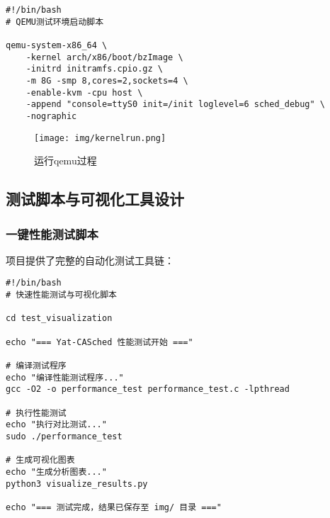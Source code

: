 \begin{tcolorbox} [
    enhanced,
    colback=green!5,
    colframe=green!40!black,
    leftrule=3mm,
    rightrule=0mm,
    toprule=0mm,
    bottomrule=0mm,
    arc=2mm,
    left=5mm,
    right=5mm,
    top=3mm,
    bottom=3mm,
    fonttitle=\bfseries,
    title=\textbf{QEMU启动脚本}
]
\begin{lstlisting}[basicstyle=\footnotesize\fontfamily{zi4}\selectfont, showstringspaces=false]
#!/bin/bash
# QEMU测试环境启动脚本

qemu-system-x86_64 \
    -kernel arch/x86/boot/bzImage \
    -initrd initramfs.cpio.gz \
    -m 8G -smp 8,cores=2,sockets=4 \
    -enable-kvm -cpu host \
    -append "console=ttyS0 init=/init loglevel=6 sched_debug" \
    -nographic
\end{lstlisting}
\end{tcolorbox}
\begin{figure}[H]
\centering

\texttt{[image: img/kernelrun.png]}

\caption{运行qemu过程}
\label{fig:kr}
\end{figure}

\subsection{测试脚本与可视化工具设计}

\subsubsection{一键性能测试脚本}
项目提供了完整的自动化测试工具链：

\begin{tcolorbox} [
    enhanced,
    colback=purple!5,
    colframe=purple!40!black,
    leftrule=3mm,
    rightrule=0mm,
    toprule=0mm,
    bottomrule=0mm,
    arc=2mm,
    left=5mm,
    right=5mm,
    top=3mm,
    bottom=3mm,
    fonttitle=\bfseries,
    title=\textbf{一键性能测试脚本}
]
\begin{lstlisting}[basicstyle=\footnotesize\fontfamily{zi4}\selectfont, showstringspaces=false]
#!/bin/bash
# 快速性能测试与可视化脚本

cd test_visualization

echo "=== Yat-CASched 性能测试开始 ==="

# 编译测试程序
echo "编译性能测试程序..."
gcc -O2 -o performance_test performance_test.c -lpthread

# 执行性能测试
echo "执行对比测试..."
sudo ./performance_test

# 生成可视化图表
echo "生成分析图表..."
python3 visualize_results.py

echo "=== 测试完成，结果已保存至 img/ 目录 ==="
\end{lstlisting}
\end{tcolorbox}

